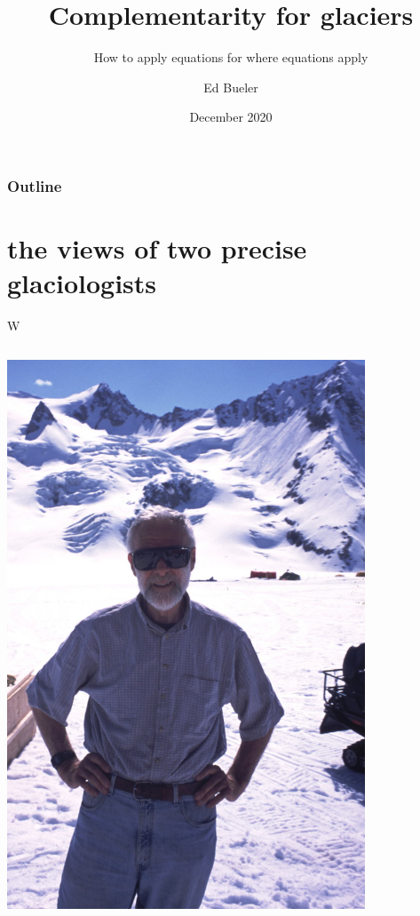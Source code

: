 \documentclass[10pt,hyperref,dvipsnames]{beamer}
\title{Complementarity for glaciers}
\subtitle{How to apply equations for where equations apply}
\author{Ed Bueler}
\institute[UAF]{University of Alaska Fairbanks}
\date{December 2020}
\begin{document}
\beamertemplatenavigationsymbolsempty

\begin{frame}
  \maketitle
\end{frame}

\begin{frame}
  \frametitle{Outline}
  \tableofcontents[hideallsubsections]
\end{frame}


\section{the views of two precise glaciologists}

\begin{frame}{W}

\begin{columns}
\begin{column}{0.5\textwidth}
\includegraphics[width=0.8\textwidth]{figs/Will-by-Truffer.jpg}


\end{column}
\end{columns}
\end{frame}
\end{document}
